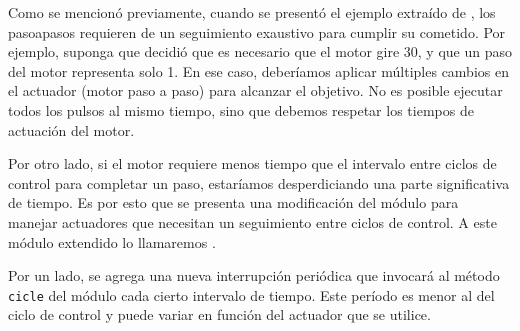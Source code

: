 
Como se mencionó previamente, cuando se presentó el ejemplo extraído de \cite{douglass}, los \glspl{pasoapaso} requieren de un seguimiento exaustivo para cumplir su cometido. Por ejemplo, suponga que \Control decidió que es necesario que el motor gire 30\textdegree, y que un paso del motor representa solo 1\textdegree. En ese caso, deberíamos aplicar múltiples cambios en el actuador (motor paso a paso) para alcanzar el objetivo. No es posible ejecutar todos los pulsos al mismo tiempo, sino que debemos respetar los tiempos de actuación del motor.

Por otro lado, si el motor requiere menos tiempo que el intervalo entre ciclos de control para completar un paso, estaríamos desperdiciando una parte significativa de tiempo. Es por esto que se presenta una modificación del módulo \Control para manejar actuadores que necesitan un seguimiento entre ciclos de control. A este módulo extendido lo llamaremos \ControlSeguimiento.

Por un lado, se agrega una nueva interrupción periódica que invocará al método \verb|cicle| del módulo \ControlSeguimiento cada cierto intervalo de tiempo. Este período es menor al del ciclo de control y puede variar en función del actuador que se utilice.

